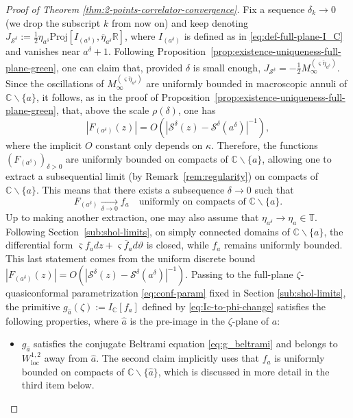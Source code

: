 \documentclass[reqno]{amsart}
\numberwithin{equation}{section}
\theoremstyle{definition}
\theoremstyle{remark}
\newcommand\C{\mathbb{C}}
\newcommand\cS{\mathcal{S}}
\begin{document}
\begin{proof}[Proof of Theorem \ref{thm:2-points-correlator-convergence}]
Fix a sequence $\delta_k \rightarrow 0$ (we drop the subscript $k$ from now on) and keep denoting $J_{\cS^\delta}:= \frac{1}{2}\eta_{a^{\delta}}\textrm{Proj}[I_{(a^\delta)}, \overline{\eta}_{a^{\delta}} \mathbb{R}]$, where $I_{(a^\delta)}$ is defined as in \eqref{eq:def-full-plane-I_C} and vanishes near $a^\delta + 1$. Following Proposition~\ref{prop:existence-uniqueness-full-plane-green}, one can claim that, provided $\delta$ is small enough, $J_{\cS^\delta}=-\frac{1}{2}M_\infty^{(\overline{\varsigma \eta_{a^\delta}})}$. Since the oscillations of $M_\infty^{(\overline{\varsigma \eta_{a^\delta}})}$ are uniformly bounded in macroscopic annuli of $\C \backslash \{ a \}$, it follows, as in the proof of Proposition~\ref{prop:existence-uniqueness-full-plane-green}, that, above the scale $\rho(\delta) $, one has
\begin{equation*}
	|F_{(a^\delta)}(z)| = O(|\cS^\delta (z)-\cS^\delta(a^\delta)|^{-1}),
\end{equation*}
where the implicit $O$ constant only depends on $\kappa$. Therefore, the functions $(F_{(a^\delta)})_{\delta >0}$ are uniformly bounded on compacts of $\C \backslash \{ a \}$, allowing one to extract a subsequential limit (by Remark~\ref{rem:regularity}) on compacts of $\C \backslash \{ a \}$. This means that there exists a subsequence $\delta \to 0$ such that 
\begin{equation}
	F_{(a^\delta)} \underset{\delta \to 0}{\longrightarrow} f_a \quad \textrm{uniformly on compacts of } \C \backslash \{ a \}.
\end{equation}
Up to making another extraction, one may also assume that $\eta_{a^\delta} \to \eta_a \in \mathbb{T}$. Following Section~\ref{sub:shol-limits}, on simply connected domains of $\C \backslash \{ a \}$, the differential form $\overline{\varsigma} f_a dz + \varsigma \overline{f}_a d\vartheta$ is closed, while $f_a$ remains uniformly bounded. This last statement comes from the uniform discrete bound $|F_{(a^\delta)}(z)| = O(|\cS^\delta (z)-\cS^\delta(a^\delta)|^{-1})$. 
Passing to the full-plane $\zeta$-quasiconformal parametrization \eqref{eq:conf-param} fixed in Section \ref{sub:shol-limits}, the primitive $g_{\hat{a}}(\zeta):= I_{\C}[f_a]$ defined by \eqref{eq:Ic-to-phi-change} satisfies the following properties, where $\hat{a} $ is the pre-image in the $\zeta$-plane of $a$:
\begin{itemize}
	\item $g_{\hat{a}}$ satisfies the conjugate Beltrami equation \eqref{eq:g_beltrami} and belongs to $W^{1,2}_{\mathrm{loc}}$ away from $\hat{a}$. The second claim implicitly uses that $f_a$ is uniformly bounded on compacts of $\mathbb{C} \backslash \{ \hat{a} \}$, which is discussed in more detail in the third item below.

\end{itemize}
\end{proof}
\end{document}
